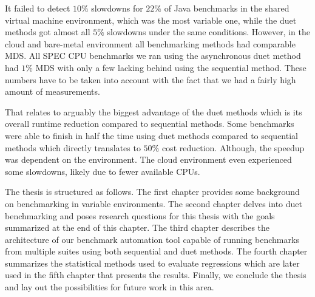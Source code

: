 It failed to detect $10\%$ slowdowns for $22\%$ of Java benchmarks in the shared virtual machine environment, which was the most variable one, while the duet methods got almost all $5\%$ slowdowns under the same conditions.
However, in the cloud and \mbox{bare-metal} environment all benchmarking methods had comparable MDS.
All SPEC CPU benchmarks we ran using the asynchronous duet method had $1\%$ MDS with only a few lacking behind using the sequential method.
These numbers have to be taken into account with the fact that we had a fairly high amount of measurements.

That relates to arguably the biggest advantage of the duet methods which is its overall runtime reduction compared to sequential methods.
Some benchmarks were able to finish in half the time using duet methods compared to sequential methods which directly translates to $50\%$ cost reduction.
Although, the speedup was dependent on the environment.
The cloud environment even experienced some slowdowns, likely due to fewer available CPUs.

The thesis is structured as follows.
The first chapter provides some background on benchmarking in variable environments.
The second chapter delves into duet benchmarking and poses research questions for this thesis with the goals summarized at the end of this chapter.
The third chapter describes the architecture of our benchmark automation tool capable of running benchmarks from multiple suites using both sequential and duet methods.
The fourth chapter summarizes the statistical methods used to evaluate regressions which are later used in the fifth chapter that presents the results.
Finally, we conclude the thesis and lay out the possibilities for future work in this area.
